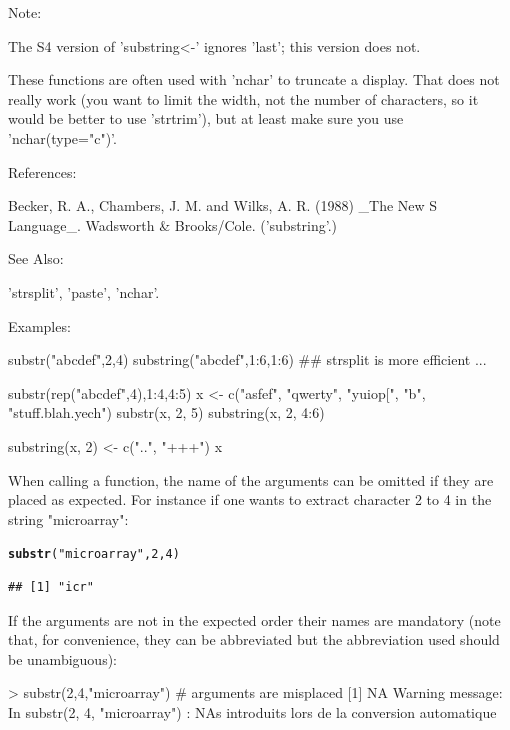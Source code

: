 \documentclass[10pt]{article}\usepackage[]{graphicx}\usepackage[]{color}
\makeatletter
\newcommand{\hlnum}[1]{\textcolor[rgb]{0.686,0.059,0.569}{#1}}%
\newcommand{\hlstr}[1]{\textcolor[rgb]{0.192,0.494,0.8}{#1}}%
\newcommand{\hlstd}[1]{\textcolor[rgb]{0.345,0.345,0.345}{#1}}%
\newcommand{\hlkwd}[1]{\textcolor[rgb]{0.737,0.353,0.396}{\textbf{#1}}}%
\newenvironment{kframe}{%
 \def\at@end@of@kframe{}%
 \ifinner\ifhmode%
  \def\at@end@of@kframe{\end{minipage}}%
  \begin{minipage}{\columnwidth}%
 \fi\fi%
 \def\FrameCommand##1{\hskip\@totalleftmargin \hskip-\fboxsep
 \colorbox{shadecolor}{##1}\hskip-\fboxsep
     \hskip-\linewidth \hskip-\@totalleftmargin \hskip\columnwidth}%
 \MakeFramed {\advance\hsize-\width
   \@totalleftmargin\z@ \linewidth\hsize
   \@setminipage}}%
 {\par\unskip\endMakeFramed%
 \at@end@of@kframe}
\newenvironment{knitrout}{}{} %
\makeatother
\begin{document}
\begin{scriptsize}
\begin{Soutput}
Note:

     The S4 version of 'substring<-' ignores 'last'; this version does
     not.

     These functions are often used with 'nchar' to truncate a display.
      That does not really work (you want to limit the width, not the
     number of characters, so it would be better to use 'strtrim'), but
     at least make sure you use 'nchar(type="c")'.

References:

     Becker, R. A., Chambers, J. M. and Wilks, A. R. (1988) _The New S
     Language_. Wadsworth & Brooks/Cole. ('substring'.)

See Also:

     'strsplit', 'paste', 'nchar'.

Examples:

     substr("abcdef",2,4)
     substring("abcdef",1:6,1:6)
     ## strsplit is more efficient ...

     substr(rep("abcdef",4),1:4,4:5)
     x <- c("asfef", "qwerty", "yuiop[", "b", "stuff.blah.yech")
     substr(x, 2, 5)
     substring(x, 2, 4:6)

     substring(x, 2) <- c("..", "+++")
     x
\end{Soutput}
\end{scriptsize}
\medskip
When calling a function, the name of the arguments can be omitted if they are placed as expected. For instance if one wants to extract character 2 to 4 in the string "microarray":

\begin{knitrout}
\color{fgcolor}\begin{kframe}
\begin{alltt}
\hlkwd{substr}\hlstd{(}\hlstr{"microarray"}\hlstd{,} \hlnum{2}\hlstd{,}\hlnum{4}\hlstd{)}
\end{alltt}
\begin{verbatim}
## [1] "icr"
\end{verbatim}
\end{kframe}
\end{knitrout}
\medskip
If the  arguments are not in the expected order their names are mandatory (note that, for convenience, they can be abbreviated but the abbreviation used should be unambiguous):


\begin{Soutput}
> substr(2,4,"microarray")                    # arguments are misplaced
[1] NA
Warning message:
In substr(2, 4, "microarray") :
  NAs introduits lors de la conversion automatique
\end{Soutput}
\end{document}

